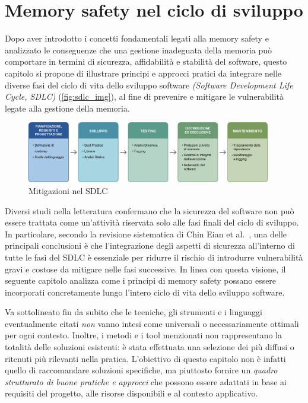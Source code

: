 \chapter{Memory safety nel ciclo di sviluppo}
\label{cha:sdlc}

Dopo aver introdotto i concetti fondamentali legati alla memory safety e
analizzato le conseguenze che una gestione inadeguata della memoria può
comportare in termini di sicurezza, affidabilità e stabilità del software,
questo capitolo si propone di illustrare principi e approcci pratici da
integrare nelle diverse fasi del ciclo di vita dello sviluppo software \textit{(Software
Development Life Cycle, SDLC)} (\autoref{fig:sdlc_img}), al fine di prevenire e
mitigare le vulnerabilità legate alla gestione della memoria.

\begin{figure}[htbp]
  \centering
  \includegraphics[width=0.95\textwidth]{images/sdlc_recap.png}
  \caption[Schema SDLC]{Mitigazioni nel SDLC\protect}
  \label{fig:sdlc_img}
\end{figure}

Diversi studi nella letteratura confermano che la sicurezza del software non può
essere trattata come un'attività riservata solo alle fasi finali del ciclo di sviluppo.
In particolare, secondo la revisione sistematica di Chin Eian et al.~\cite{security_in_sdlc},
una delle principali conclusioni è che l'integrazione degli aspetti di sicurezza
all'interno di tutte le fasi del SDLC è essenziale per ridurre il rischio di
introdurre vulnerabilità gravi e costose da mitigare nelle fasi successive. In linea
con questa visione, il seguente capitolo analizza come i principi di memory
safety possano essere incorporati concretamente lungo l'intero ciclo di vita
dello sviluppo software.

Va sottolineato fin da subito che le tecniche, gli strumenti e i linguaggi eventualmente
citati \textit{non} vanno intesi come universali o necessariamente ottimali per
ogni contesto. Inoltre, i metodi e i tool menzionati non rappresentano la
totalità delle soluzioni esistenti: è stata effettuata una selezione dei più diffusi
o ritenuti più rilevanti nella pratica. L'obiettivo di questo capitolo non è
infatti quello di raccomandare soluzioni specifiche, ma piuttosto fornire un \textit{quadro
strutturato di buone pratiche e approcci} che possono essere adattati in base ai
requisiti del progetto, alle risorse disponibili e al contesto applicativo.






